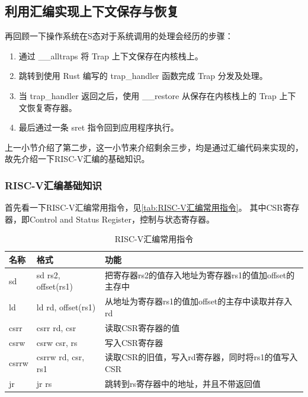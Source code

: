 \subsection{利用汇编实现上下文保存与恢复}

再回顾一下操作系统在S态对于系统调用的处理会经历的步骤：

\begin{enumerate}
    \item 通过 __alltraps 将 Trap 上下文保存在内核栈上。
    \item 跳转到使用 Rust 编写的 trap_handler 函数完成 Trap 分发及处理。
    \item 当 trap_handler 返回之后，使用 __restore 从保存在内核栈上的 Trap 上下文恢复寄存器。
    \item 最后通过一条 sret 指令回到应用程序执行。
\end{enumerate}

上一小节介绍了第二步，这一小节来介绍剩余三步，均是通过汇编代码来实现的，故先介绍一下RISC-V汇编的基础知识。

\subsubsection{RISC-V汇编基础知识}

首先看一下RISC-V汇编常用指令，见\autoref{tab:RISC-V汇编常用指令}。
其中CSR寄存器，即Control and Status Register，控制与状态寄存器。

\begin{table}[h]
    \centering
    \caption{RISC-V汇编常用指令}
    \label{table:RISC-V汇编常用指令}
    \begin{tabularx}{0.8\textwidth}{|p{1cm}|p{3cm}|X|}
    \hline
    \textbf{名称} & \textbf{格式} & \textbf{功能}                                      \\\hline
    sd     & sd rs2, offset(rs1) & 把寄存器rs2的值存入地址为寄存器rs1的值加offset的主存中 \\\hline
    ld     & ld rd, offset(rs1)  & 从地址为寄存器rs1的值加offset的主存中读取并存入rd      \\\hline
    csrr   & csrr rd, csr        & 读取CSR寄存器的值                                    \\\hline
    csrw   & csrw csr, rs        & 写入CSR寄存器                                       \\\hline
    csrrw  & csrrw rd, csr, rs1  & 读取CSR的旧值，写入rd寄存器，同时将rs1的值写入CSR     \\\hline
    jr     & jr rs               & 跳转到rs寄存器中的地址，并且不带返回值                \\\hline
    \end{tabularx}
\end{table}

